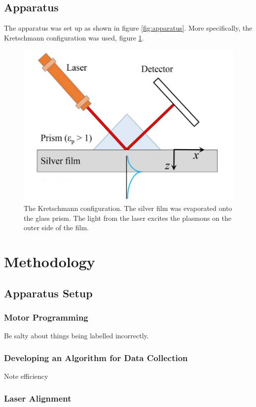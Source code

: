 \documentclass[%
reprint,
amsmath,amssymb,
aps,
]{revtex4-2}
\begin{document}
		\subsection{Apparatus}
			The apparatus was set up as shown in figure \ref{fig:apparatus}. More specifically, the Kretschmann configuration was used, figure \ref{fig:kConfig}.
			
			\begin{figure}
				\includegraphics[width=0.9\columnwidth]{kConfig.png}
				\caption{\label{fig:kConfig} The Kretschmann configuration. The silver film was evaporated onto the glass prism. The light from the laser excites the plasmons on the outer side of the film. \cite{opticalApplications}}
			\end{figure}
	 
	\section{Methodology}
		\subsection{Apparatus Setup}
			\subsubsection{Motor Programming}
				Be salty about things being labelled incorrectly.
			
			\subsubsection{Developing an Algorithm for Data Collection}
				Note efficiency
			
			\subsubsection{Laser Alignment}
			
\end{document}

